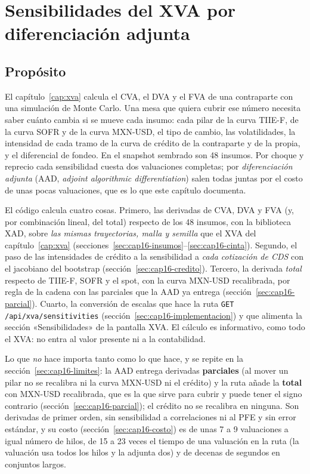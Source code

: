 \chapter{Sensibilidades del XVA por diferenciación adjunta}\label{cap:xva-aad}

\section{Propósito}\label{sec:cap16-proposito}

El capítulo~\ref{cap:xva} calcula el CVA, el DVA y el FVA de una contraparte con una simulación de Monte Carlo. Una
mesa que quiera cubrir ese número necesita saber cuánto cambia si se mueve cada insumo: cada pilar de la curva
TIIE-F, de la curva SOFR y de la curva MXN-USD, el tipo de cambio, las volatilidades, la intensidad de cada tramo de
la curva de crédito de la contraparte y de la propia, y el diferencial de fondeo. En el snapshot sembrado son
48 insumos. Por choque y reprecio cada sensibilidad cuesta dos valuaciones completas; por \emph{diferenciación
adjunta} (AAD, \emph{adjoint algorithmic differentiation}) salen todas juntas por el costo de unas pocas
valuaciones, que es lo que este capítulo documenta.

El código calcula cuatro cosas. Primero, las derivadas de CVA, DVA y FVA (y, por combinación lineal, del total) respecto
de los 48 insumos, con la biblioteca XAD, sobre \emph{las mismas trayectorias, malla y semilla} que el XVA del
capítulo~\ref{cap:xva} (secciones~\ref{sec:cap16-insumos}--\ref{sec:cap16-cinta}). Segundo, el paso de las
intensidades de crédito a la sensibilidad a \emph{cada cotización de CDS} con el jacobiano del bootstrap
(sección~\ref{sec:cap16-credito}). Tercero, la derivada \emph{total} respecto de TIIE-F, SOFR y el spot, con la curva
MXN-USD recalibrada, por regla de la cadena con las parciales que la AAD ya entrega
(sección~\ref{sec:cap16-parcial}). Cuarto, la conversión de escalas que hace la ruta
\texttt{GET /api/xva/sensitivities} (sección~\ref{sec:cap16-implementacion}) y que alimenta la sección
«Sensibilidades» de la pantalla XVA. El cálculo es informativo, como todo el XVA: no entra al valor presente ni a
la contabilidad.

Lo que \emph{no} hace importa tanto como lo que hace, y se repite en la sección~\ref{sec:cap16-limites}: la AAD entrega
derivadas \textbf{parciales} (al mover un pilar no se recalibra ni la curva MXN-USD ni el crédito) y la ruta añade la
\textbf{total} con MXN-USD recalibrada, que es la que sirve para cubrir y puede tener el signo contrario
(sección~\ref{sec:cap16-parcial}); el crédito no se recalibra en ninguna. Son derivadas de primer orden, sin sensibilidad
a correlaciones ni al PFE y sin error estándar, y su costo (sección~\ref{sec:cap16-costo}) es de unas 7 a 9
valuaciones a igual número de hilos, de 15 a 23 veces el tiempo de una valuación en la ruta (la valuación usa todos
los hilos y la adjunta dos) y de decenas de segundos en conjuntos largos.


